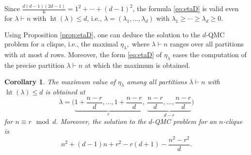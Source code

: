\documentclass[12pt,dvipsnames,accepted=2016-08-18,a4paper,onecolumn]{quantumarticle}
\DeclareMathOperator{\het}{ht}
\numberwithin{equation}{section}
\newtheorem{corollary}[theorem]{Corollary}
\theoremstyle{definition}
\begin{document}
Since $\frac{d(d-1)(2d-1)}{6}=1^2+\cdots+(d-1)^2$, the formula \eqref{eq:etaD} is valid even for $\lambda\vdash n$ with $\het(\lambda)\le d$, i.e., $\lambda=(\lambda_1,\dots,\lambda_d)$ with $\lambda_1\ge\cdots\ge \lambda_d\ge0$.


Using Proposition \ref{prop:etaD}, one can deduce the solution to the $d$-QMC problem for a clique, i.e., the maximal $\eta_\lambda,$  where $\lambda \vdash n$ ranges over all partitions with at most $d$ rows. 
Moreover, the form \eqref{eq:etaD} of $\eta_\lambda$ eases the computation of the precise partition $\lambda \vdash n$ at which the maximum is obtained.


\begin{corollary}\label{prop:69++}
	The maximum value of $\eta_\lambda$ among all partitions $\lambda\vdash n$ with $\het(\lambda)\leq d$ is obtained at
	\begin{equation}\label{eq:answ}
	\lambda=\Big( 
\underbrace{1+\frac{n-r}d, \ldots, 1+\frac{n-r}d}_{r},\ 
\underbrace{\frac{n-r}d, \ldots, \frac{n-r}d}_{d-r}
	\Big)
	\end{equation}
	for $n\equiv r\mod d.$ Moreover, the solution to the $d$-QMC problem for an $n$-clique is \begin{equation}\label{eq:etamax}
	     n^2 + (d-1) n + r^2 - r(d+1) - \frac{n^2-r^2}{d}.
	\end{equation}
\end{corollary}
\end{document}
